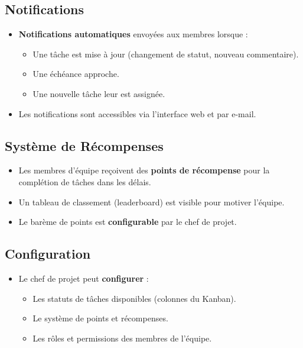 \documentclass[11pt,a4paper]{report}
\begin{document}
\subsection{Notifications}
\begin{tcolorbox}[enhanced, colback=lightgray, colframe=primarycolor, arc=2mm, boxrule=0.5pt, breakable]
    \begin{itemize}
        \item \textbf{Notifications automatiques} envoyées aux membres lorsque :
              \begin{itemize}
                  \item Une tâche est mise à jour (changement de statut, nouveau commentaire).
                  \item Une échéance approche.
                  \item Une nouvelle tâche leur est assignée.
              \end{itemize}
        \item Les notifications sont accessibles via l'interface web et par e-mail.
    \end{itemize}
\end{tcolorbox}

\subsection{Système de Récompenses}
\begin{tcolorbox}[enhanced, colback=lightgray, colframe=primarycolor, arc=2mm, boxrule=0.5pt, breakable]
    \begin{itemize}
        \item Les membres d'équipe reçoivent des \textbf{points de récompense} pour la complétion de tâches dans les délais.
        \item Un tableau de classement (leaderboard) est visible pour motiver l'équipe.
        \item Le barème de points est \textbf{configurable} par le chef de projet.
    \end{itemize}
\end{tcolorbox}

\subsection{Configuration}
\begin{tcolorbox}[enhanced, colback=lightgray, colframe=primarycolor, arc=2mm, boxrule=0.5pt, breakable]
    \begin{itemize}
        \item Le chef de projet peut \textbf{configurer} :
              \begin{itemize}
                  \item Les statuts de tâches disponibles (colonnes du Kanban).
                  \item Le système de points et récompenses.
                  \item Les rôles et permissions des membres de l'équipe.
              \end{itemize}
    \end{itemize}
\end{tcolorbox}
\end{document}
